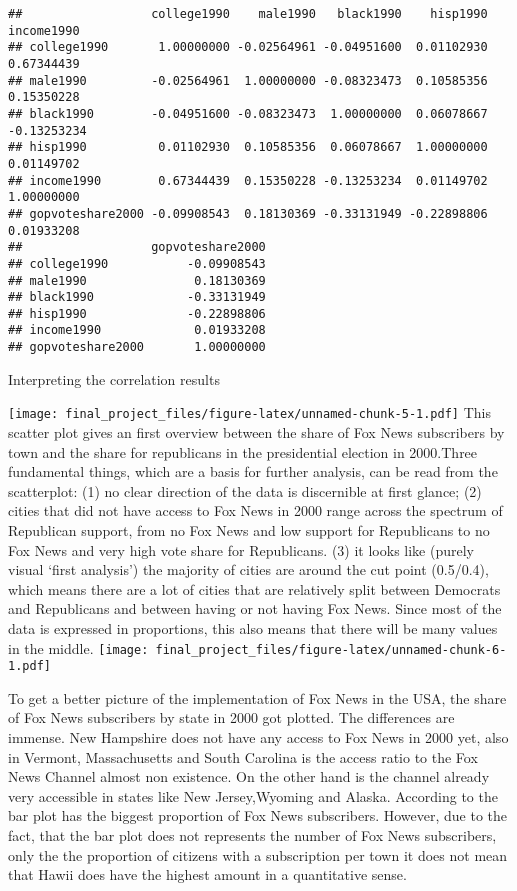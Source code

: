 \documentclass[
]{article}
\begin{document}
\begin{verbatim}
##                  college1990    male1990   black1990    hisp1990  income1990
## college1990       1.00000000 -0.02564961 -0.04951600  0.01102930  0.67344439
## male1990         -0.02564961  1.00000000 -0.08323473  0.10585356  0.15350228
## black1990        -0.04951600 -0.08323473  1.00000000  0.06078667 -0.13253234
## hisp1990          0.01102930  0.10585356  0.06078667  1.00000000  0.01149702
## income1990        0.67344439  0.15350228 -0.13253234  0.01149702  1.00000000
## gopvoteshare2000 -0.09908543  0.18130369 -0.33131949 -0.22898806  0.01933208
##                  gopvoteshare2000
## college1990           -0.09908543
## male1990               0.18130369
## black1990             -0.33131949
## hisp1990              -0.22898806
## income1990             0.01933208
## gopvoteshare2000       1.00000000
\end{verbatim}

Interpreting the correlation results

\texttt{[image: final\_project\_files/figure-latex/unnamed-chunk-5-1.pdf]}
This scatter plot gives an first overview between the share of Fox News subscribers by town and the share for republicans in the presidential election in 2000.Three fundamental things, which are a basis for further analysis, can be read from the scatterplot: (1) no clear direction of the data is discernible at first glance; (2) cities that did not have access to Fox News in 2000 range across the spectrum of Republican support, from no Fox News and low support for Republicans to no Fox News and very high vote share for Republicans. (3) it looks like (purely visual `first analysis') the majority of cities are around the cut point (0.5/0.4), which means there are a lot of cities that are relatively split between Democrats and Republicans and between having or not having Fox News. Since most of the data is expressed in proportions, this also means that there will be many values in the middle.
\texttt{[image: final\_project\_files/figure-latex/unnamed-chunk-6-1.pdf]}

To get a better picture of the implementation of Fox News in the USA, the share of Fox News subscribers by state in 2000 got plotted. The differences are immense. New Hampshire does not have any access to Fox News in 2000 yet, also in Vermont, Massachusetts and South Carolina is the access ratio to the Fox News Channel almost non existence. On the other hand is the channel already very accessible in states like New Jersey,Wyoming and Alaska. According to the bar plot has the biggest proportion of Fox News subscribers. However, due to the fact, that the bar plot does not represents the number of Fox News subscribers, only the the proportion of citizens with a subscription per town it does not mean that Hawii does have the highest amount in a quantitative sense.
\end{document}
